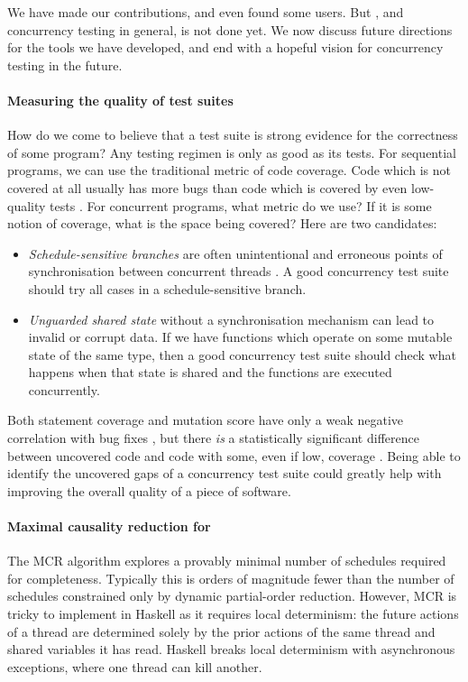 We have made our contributions, and even found some users.  But
\dejafu{}, and concurrency testing in general, is not done yet.  We
now discuss future directions for the tools we have developed, and end
with a hopeful vision for concurrency testing in the future.

\paragraph{Measuring the quality of test suites}
How do we come to believe that a test suite is strong evidence for the
correctness of some program?  Any testing regimen is only as good as
its tests.  For sequential programs, we can use the traditional metric
of code coverage.  Code which is not covered at all usually has more
bugs than code which is covered by even low-quality
tests \parencite{ahmed2016}.  For concurrent programs, what metric do we
use?  If it is some notion of coverage, what is the space being
covered?  Here are two candidates:

\begin{itemize}
\item \emph{Schedule-sensitive branches} are often unintentional and
  erroneous points of synchronisation between concurrent
  threads \parencite{huang2015ssb}.  A good concurrency test suite should
  try all cases in a schedule-sensitive branch.

\item \emph{Unguarded shared state} without a synchronisation
  mechanism can lead to invalid or corrupt data.  If we have functions
  which operate on some mutable state of the same type, then a good
  concurrency test suite should check what happens when that state is
  shared and the functions are executed concurrently.
\end{itemize}

Both statement coverage and mutation score have only a weak negative
correlation with bug fixes \parencite{ahmed2016}, but there \emph{is} a
statistically significant difference between uncovered code and code
with some, even if low, coverage \parencite{ahmed2016}.  Being able to
identify the uncovered gaps of a concurrency test suite could greatly
help with improving the overall quality of a piece of software.

\paragraph{Maximal causality reduction for \dejafu{}}
The MCR algorithm \parencite{huang2015} explores a provably minimal number
of schedules required for completeness.  Typically this is orders of
magnitude fewer than the number of schedules constrained only by
dynamic partial-order reduction.  However, MCR is tricky to implement
in Haskell as it requires local determinism: the future actions of a
thread are determined solely by the prior actions of the same thread
and shared variables it has read.  Haskell breaks local determinism
with asynchronous exceptions, where one thread can kill another.

